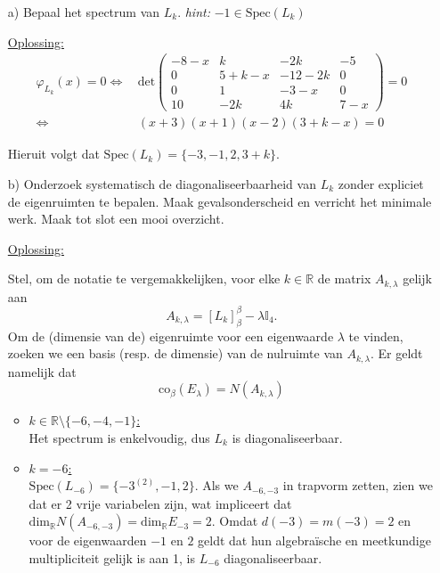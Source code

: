 \documentclass[kulak]{kulakarticle} %
\newcommand{\R}{\mathbb{R}} %
\begin{document}
\begin{itemize}
	\item[a)] Bepaal het spectrum van \(L_k\). \hspace{1cm} \textit{hint:} \(-1 \in \text{Spec}(L_k)\)

	\underline{Oplossing:}
	\begin{align*}
		\varphi_{L_k}(x)=0 \Longleftrightarrow& \, \text{det}\left(\begin{matrix}
			-8-x & k     & -2k    & -5  \\
			0    & 5+k-x & -12-2k & 0   \\
			0    & 1     & -3-x   & 0   \\
			10   & -2k   & 4k     & 7-x
		\end{matrix}\right) = 0 \\
						\Longleftrightarrow& \, (x+3)(x+1)(x-2)(3+k-x)=0
	\end{align*}

	Hieruit volgt dat \(\text{Spec}(L_k)=\{-3,-1,2,3+k\}\).

	\item[b)] Onderzoek systematisch de diagonaliseerbaarheid van \(L_k\) zonder expliciet de eigenruimten te bepalen. Maak gevalsonderscheid en verricht het minimale werk. Maak tot slot een mooi overzicht.

	\underline{Oplossing:}

	Stel, om de notatie te vergemakkelijken, voor elke \(k\in\R\) de matrix \(A_{k,\lambda}\) gelijk aan \[A_{k,\lambda}=  [L_k]_{\beta}^{\beta}-\lambda \mathbb{I}_4.\] Om de (dimensie van de) eigenruimte voor een eigenwaarde \(\lambda\) te vinden, zoeken we een basis (resp. de dimensie) van de nulruimte van \(A_{k,\lambda}\). Er geldt namelijk dat \[\text{co}_{\beta}(E_{\lambda})=N(A_{k,\lambda})\]

	\begin{itemize}
		\item \underline{\(k \in \R \setminus \{-6,-4,-1\} \):}\\
		Het spectrum is enkelvoudig, dus \(L_k\) is diagonaliseerbaar.

		\item \underline{\(k = -6\):}\\
		\(\text{Spec}(L_{-6})=\{-3^{(2)},-1,2\}\). Als we \(A_{-6,-3}\) in trapvorm zetten, zien we dat er 2 vrije variabelen zijn, wat impliceert dat \(\text{dim}_{\R}N(A_{-6,-3})=\text{dim}_{\R}E_{-3}=2\). Omdat \(d(-3)=m(-3)=2\) en voor de eigenwaarden \(-1\) en \(2\) geldt dat hun algebraïsche en meetkundige multipliciteit gelijk is aan 1, is \(L_{-6}\) diagonaliseerbaar.


\end{itemize}
\end{itemize}
\end{document}
